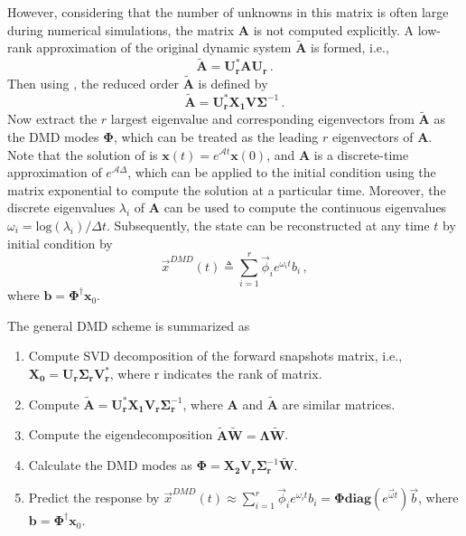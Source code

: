 However, considering that the number of unknowns in this matrix is often large during numerical simulations, the matrix $\mathbf{A}$ is not computed explicitly.
A low-rank approximation of the original dynamic system $\mathbf{\tilde{A}}$ is formed, i.e.,
\begin{equation}
\label{eq:reduced_dmd_1}
\mathbf{\tilde{A}} =  \mathbf{U_r^* A U_r} \, .
\end{equation}
Then using , the reduced order $\mathbf{\tilde{A}}$ is defined by
\begin{equation}
\label{eq:reduced_dmd_2}
\mathbf{\tilde{A}} =  \mathbf{U_r^*} \mathbf{X_1} \mathbf{V} \bm{\Sigma}^{-1} \, .
\end{equation}
Now extract the $r$ largest eigenvalue and corresponding eigenvectors from $\mathbf{\tilde{A}}$ as the DMD modes $\boldsymbol{\Phi}$, which can be treated as the leading $r$ eigenvectors of $\mathbf{A}$.
Note that the solution of  is $\mathbf{x}(t) = e^{\mathcal{A}t}\mathbf{x}(0)$, and $\mathbf{A}$ is a discrete-time approximation of $e^{\mathcal{A}\Delta}$, which can be applied to the initial condition using the matrix exponential to compute the solution at a particular time. 
Moreover, the discrete eigenvalues $\lambda_i$ of $\mathbf{A}$ can be used to compute the continuous eigenvalues $\omega_i= \text{log}(\lambda_i)/\Delta t$.
Subsequently, the state can be reconstructed at any time $t$ by initial condition by  
\begin{equation}
\label{eq:dmd_predict}
\vec{x}^{DMD}(t) \triangleq \sum_{i=1}^{r} \vec{\phi}_i e^{\omega_it} b_i \, ,
\end{equation}
where $\mathbf{b}=\boldsymbol{\Phi}^{\dag} \mathbf{x}_{0}$. 

The general DMD scheme is summarized as
\begin{enumerate}
\item Compute SVD decomposition of the forward snapshots matrix, i.e., $ \mathbf{X_0} = \mathbf{U_r} \boldsymbol{\Sigma_r} \mathbf{V_r^{*}}$, where r indicates the rank of matrix.
\item Compute $\mathbf{\tilde{A}}=\mathbf{U_r^{*}X_1}\mathbf{V_r}\boldsymbol{\Sigma}_{\mathbf{r}}^{-1}$, where $\mathbf{A}$ and $\mathbf{\tilde{A}}$ are similar matrices.
\item Compute the eigendecomposition $\mathbf{\tilde{A} \tilde{W}}=\boldsymbol{\Lambda}\mathbf{\tilde{W}}$.
\item Calculate the DMD modes as ${\boldsymbol{\Phi}}={\mathbf{X_2V_r}}\boldsymbol{\Sigma}_\mathbf{r}^{-1}{\mathbf{\tilde{W}}}$.
\item Predict the response by $\vec{x}^{DMD}(t) \approx \sum_{i=1}^{r} \vec{\phi}_i e^{\omega_it} b_i = \boldsymbol{\Phi}{\mathbf{diag}}(e^{\vec{\omega}t})\vec{b}$, where $\mathbf{b}=\boldsymbol{\Phi}^{\dag} \mathbf{x}_{0}$.
\end{enumerate}



